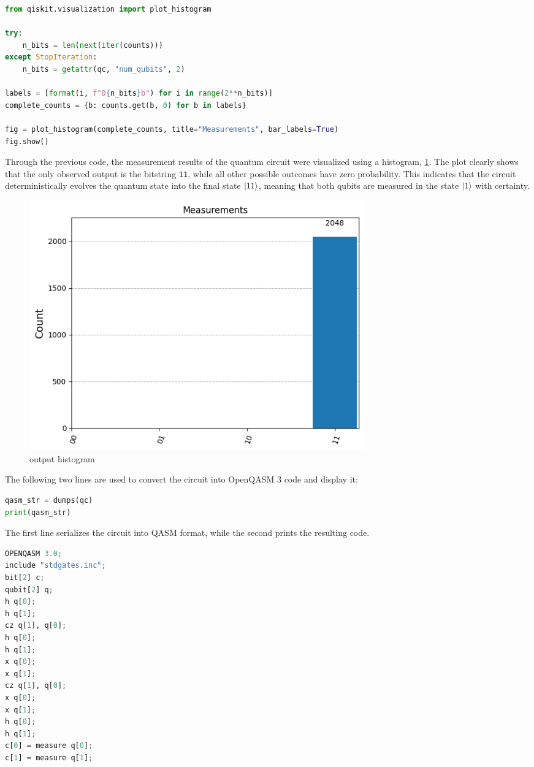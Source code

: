 \begin{lstlisting}[language=Python, caption={Histogram with zero-count states}, label={lst:qiskit-hist}]
%matplotlib inline
from qiskit.visualization import plot_histogram

try:
    n_bits = len(next(iter(counts)))
except StopIteration:
    n_bits = getattr(qc, "num_qubits", 2)

labels = [format(i, f"0{n_bits}b") for i in range(2**n_bits)]
complete_counts = {b: counts.get(b, 0) for b in labels}

fig = plot_histogram(complete_counts, title="Measurements", bar_labels=True)
fig.show()
\end{lstlisting}

Through the previous code, the measurement results of the quantum circuit were visualized using a histogram, \cref{fig:output histogram}. The plot clearly shows that the only observed output is the bitstring \texttt{11}, while all other possible outcomes have zero probability. This indicates that the circuit deterministically evolves the quantum state into the final state $\ket{11}$, meaning that both qubits are measured in the state $\ket{1}$ with certainty.

\begin{figure}[H]
    \centering
    \includegraphics[width=0.7\textwidth]{images/histograms.png}
    \caption{output histogram}
    \label{fig:output histogram}
\end{figure}


The following two lines are used to convert the circuit into OpenQASM 3 code and display it:
\begin{lstlisting}[language=Python, caption={Export circuit to QASM3}, label={lst:qasm-export}]
qasm_str = dumps(qc)
print(qasm_str)
\end{lstlisting}

The first line serializes the circuit into QASM format, while the second prints the resulting code.

\begin{lstlisting}[language=Python, caption={Output generato: OpenQASM 3}, label={lst:qasm3-output}, backgroundcolor=\color{bg}]
OPENQASM 3.0;
include "stdgates.inc";
bit[2] c;
qubit[2] q;
h q[0];
h q[1];
cz q[1], q[0];
h q[0];
h q[1];
x q[0];
x q[1];
cz q[1], q[0];
x q[0];
x q[1];
h q[0];
h q[1];
c[0] = measure q[0];
c[1] = measure q[1];
\end{lstlisting}





